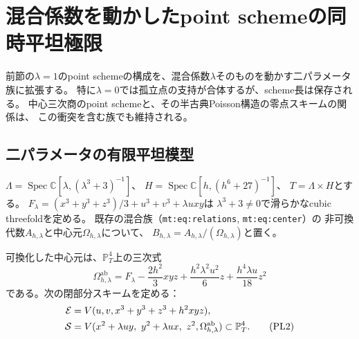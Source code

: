 \section{混合係数を動かしたpoint schemeの同時平坦極限}
\label{psl:sec:family}

前節の$\lambda=1$のpoint schemeの構成を、混合係数$\lambda$そのものを動かす二パラメータ族に拡張する。
特に$\lambda=0$では孤立点の支持が合体するが、scheme長は保存される。
中心三次商のpoint schemeと、その半古典Poisson構造の零点スキームの関係は、
この衝突を含む族でも維持される。

\subsection{二パラメータの有限平坦模型}

$\Lambda=\operatorname{Spec}\mathbb C[\lambda,(\lambda^3+3)^{-1}]$、
$H=\operatorname{Spec}\mathbb C[h,(h^6+27)^{-1}]$、
$T=\Lambda\times H$とする。
$F_\lambda=(x^3+y^3+z^3)/3+u^3+v^3+\lambda uxy$は
$\lambda^3+3\ne0$で滑らかなcubic threefoldを定める。
既存の混合族（\texttt{mt:eq:relations}, \texttt{mt:eq:center}）の
非可換代数$A_{h,\lambda}$と中心元$\Omega_{h,\lambda}$について、
$B_{h,\lambda}=A_{h,\lambda}/(\Omega_{h,\lambda})$と置く。

可換化した中心元は、$\mathbb P^4_T$上の三次式
\begin{equation}
 \Omega_{h,\lambda}^{\mathrm{ab}}
 =F_\lambda-\frac{2h^2}{3}xyz
 +\frac{h^2\lambda^2u^2}{6}z+\frac{h^4\lambda u}{18}z^2
 \tag{PL1}\label{psl:eq:abelian}
\end{equation}
である。次の閉部分スキームを定める：
\begin{align}
 \mathcal E&=V(u,v,x^3+y^3+z^3+h^2xyz),\notag\\
 \mathcal S&=V(x^2+\lambda uy,\ y^2+\lambda ux,\ z^2,
                       \Omega_{h,\lambda}^{\mathrm{ab}})
                  \subset\mathbb P^4_T.
 \tag{PL2}\label{psl:eq:families}
\end{align}

